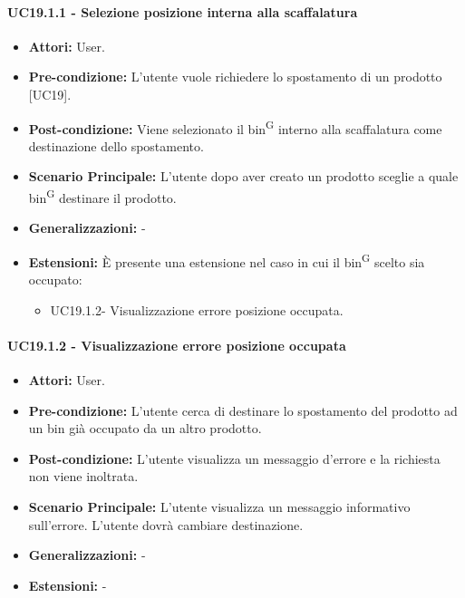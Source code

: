 \paragraph{UC19.1.1 - Selezione posizione interna alla scaffalatura}
\begin{itemize}
    \item \textbf{Attori:} User.
    \item \textbf{Pre-condizione:}  L'utente vuole richiedere lo spostamento di un prodotto [UC19].
    \item \textbf{Post-condizione:} Viene selezionato il bin\textsuperscript{G} interno alla scaffalatura come destinazione dello spostamento.
    \item \textbf{Scenario Principale:} L'utente dopo aver creato un prodotto sceglie a quale bin\textsuperscript{G} destinare il prodotto.
    \item \textbf{Generalizzazioni:} -
    \item \textbf{Estensioni:} È presente una estensione nel caso in cui il bin\textsuperscript{G} scelto sia occupato:
    \begin{itemize}
        \item UC19.1.2- Visualizzazione errore posizione occupata.
    \end{itemize}
\end{itemize}


\paragraph{UC19.1.2 - Visualizzazione errore posizione occupata}
\begin{itemize}
    \item \textbf{Attori:} User.
    \item \textbf{Pre-condizione:}  L'utente cerca di destinare lo spostamento del prodotto ad un bin già occupato da un altro prodotto.
    \item \textbf{Post-condizione:} L'utente visualizza un messaggio d'errore e la richiesta non viene inoltrata.
    \item \textbf{Scenario Principale:} L'utente visualizza un messaggio informativo sull'errore. L'utente dovrà cambiare destinazione.
    \item \textbf{Generalizzazioni:} -
    \item \textbf{Estensioni:} -
\end{itemize}


